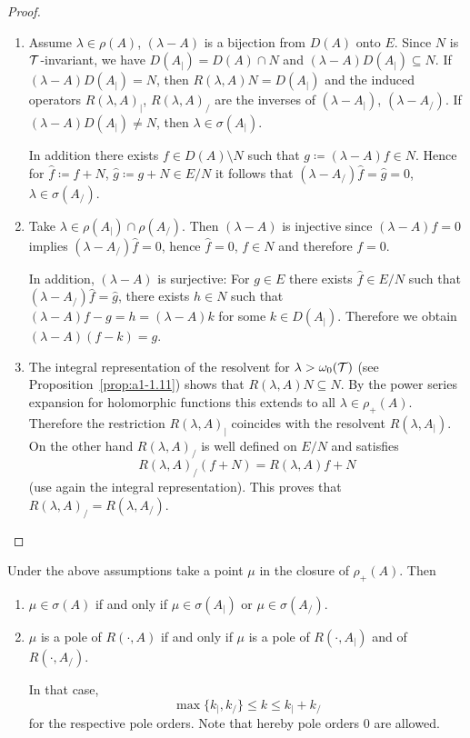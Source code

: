 \begin{proof}
\begin{enumerate}[\upshape (i), wide, labelindent=.25em]
\item 
Assume $\lambda \in \rho(A)$, \ie $(\lambda-A)$ is a bijection from $D(A)$ onto $E$.
Since $N$ is $\mathcal{T}$-invariant, we have $D(A_{|}) = D(A) \cap N$ and $(\lambda-A)D(A_{|}) \subseteq N$.
If\/ $(\lambda-A)D(A_{|}) = N$, then $R(\lambda,A)N = D(A_{|})$ and the induced operators $R(\lambda,A)_{|}$, \resp $R(\lambda,A)_{/}$ are the inverses of\/ $(\lambda-A_{|})$, \resp $(\lambda-A_{/})$.
If\/ $(\lambda-A)D(A_{|}) \neq N$, then $\lambda \in \sigma(A_{|})$.

In addition there exists $f \in D(A) \setminus N$ such that $g \coloneq (\lambda-A)f \in N$.
Hence for $\hat{f} \coloneq f+N$, $\hat{g} \coloneq g+N \in E/N$ it follows that $(\lambda-A_{/})\hat{f} = \hat{g} = 0$, \ie $\lambda \in \sigma(A_{/})$.

\item 
Take $\lambda \in \rho(A_{|}) \cap \rho(A_{/})$.
Then $(\lambda-A)$ is injective since $(\lambda-A)f = 0$ implies $(\lambda-A_{/})\hat{f}= 0$, hence $\hat{f} = 0$, \ie $f \in N$ and therefore $f = 0$.

In addition, $(\lambda-A)$ is surjective: For $g \in E$ there exists $\hat{f} \in E/N$ such that $(\lambda-A_{/})\hat{f} = \hat{g}$, \ie there exists $h \in N$ such that $(\lambda-A)f - g = h = (\lambda-A)k$ for some $k \in D(A_{|})$.
Therefore we obtain $(\lambda-A)(f-k) = g$. 

\item 
The integral representation of the resolvent for $\lambda > \omega_{0}(\mathcal{T})$ (see Proposition~\ref{prop:a1-1.11}) shows that $R(\lambda,A)N \subseteq N$.
By the power series expansion for holomorphic functions this extends to all $\lambda \in \rho_{+}(A)$.
Therefore the restriction $R(\lambda,A)_{|}$ coincides with the resolvent $R(\lambda,A_{|})$.
On the other hand $R(\lambda,A)_{/}$ is well defined on $E/N$ and satisfies
\[
R(\lambda,A)_{/}(f+N) = R(\lambda,A)f + N
\]
(use again the integral representation).
This proves that $R(\lambda,A)_{/} = R(\lambda,A_{/})$.
\qedhere
\end{enumerate}
\end{proof}
\begin{corollary}\label{cor:a3-4.3}
Under the above assumptions take a point $\mu$ in the closure of\/ $\rho_{+}(A)$.
Then
\begin{enumerate}[\upshape (i)]
\item 
$\mu \in \sigma(A)$ if and only if\/ $\mu \in \sigma(A_{|})$ or $\mu \in \sigma(A_{/})$. 

\item 
$\mu$ is a pole of\/ $R(\cdot,A)$ if and only if\/ $\mu$ is a pole of\/ $R(\cdot,A_{|})$ and of\/ $R(\cdot,A_{/})$. 

In that case,
\[
\max\{k_{|},k_{/}\} \leq k \leq k_{|} + k_{/}
\]
for the respective pole orders. Note that hereby pole orders $0$ are allowed.
\end{enumerate}
\end{corollary}
